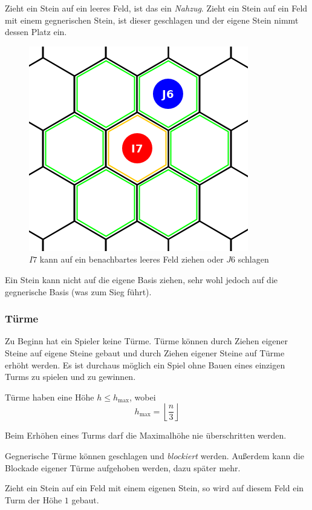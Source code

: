 Zieht ein Stein auf ein leeres Feld, ist das ein \emph{Nahzug}. Zieht ein Stein auf ein Feld mit einem gegnerischen Stein, ist dieser geschlagen und der eigene Stein nimmt dessen Platz ein.
\begin{figure}[ht]
\begin{center}
\includegraphics[scale=0.25]{graphic/token-move-kick.png}
\end{center}
\caption*{$I7$ kann auf ein benachbartes leeres Feld ziehen oder $J6$ schlagen}
\end{figure}

Ein Stein kann nicht auf die eigene Basis ziehen, sehr wohl jedoch auf die gegnerische Basis (was zum Sieg führt).
\newpage

\subsubsection*{Türme}
Zu Beginn hat ein Spieler keine Türme. Türme können durch Ziehen eigener Steine auf eigene Steine gebaut und durch Ziehen eigener Steine auf Türme erhöht werden. Es ist durchaus möglich ein Spiel ohne Bauen eines einzigen Turms zu spielen und zu gewinnen.

Türme haben eine Höhe $h \le h_\text{max}$, wobei \[h_\text{max} = \left\lfloor \frac{n}{3}\right\rfloor\]

Beim Erhöhen eines Turms darf die Maximalhöhe nie überschritten werden.

Gegnerische Türme können geschlagen und \emph{blockiert} werden. Außerdem kann die Blockade eigener Türme aufgehoben werden, dazu  später mehr. 
\bigskip

Zieht ein Stein auf ein Feld mit einem eigenen Stein, so wird auf diesem Feld ein Turm der Höhe $1$ gebaut.

